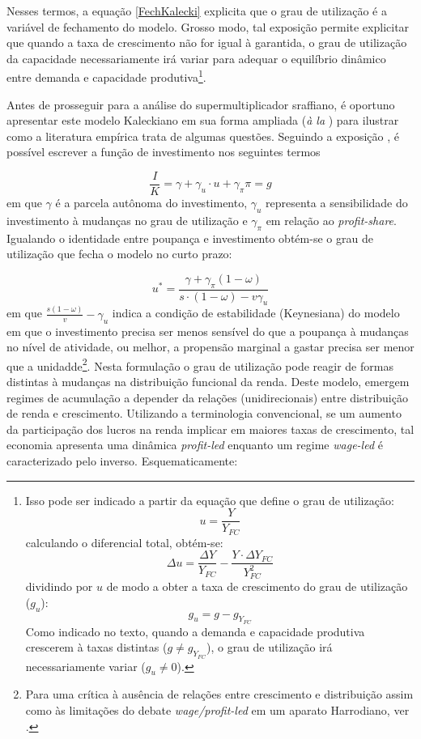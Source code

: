 Nesses termos, a equação \ref{FechKalecki} explicita que o grau de utilização é a variável de fechamento do modelo. Grosso modo, tal exposição permite explicitar que quando a taxa de crescimento não for igual à garantida, o grau de utilização da capacidade necessariamente irá variar para adequar o equilíbrio dinâmico entre demanda e capacidade produtiva\footnote{Isso pode ser indicado a partir da equação que define o grau de utilização:
$$
u = \frac{Y}{Y_{FC}}
$$
calculando o diferencial total, obtém-se:
$$
\Delta u = \frac{\Delta Y}{ Y_{FC}} - \frac{Y\cdot \Delta Y_{FC}}{Y_{FC}^2}
$$
dividindo por $u$ de modo a obter a taxa de crescimento do grau de utilização ($g_u$):
$$
g_u = g - g_{Y_{FC}}
$$
Como indicado no texto, quando a demanda e capacidade produtiva crescerem à taxas distintas ($g \neq g_{Y_{FC}}$), o grau de utilização irá necessariamente variar ($g_u \neq 0$).
}.

Antes de prosseguir para a análise do supermultiplicador sraffiano, é oportuno apresentar este modelo Kaleckiano em sua forma ampliada (\textit{à la} \textcite{bhaduri_unemployment_1990}) para ilustrar como a literatura empírica trata de algumas questões. Seguindo a exposição \textcite[Cap, 6]{lavoie_post-keynesian_2015}, é possível escrever a função de investimento nos seguintes termos

\begin{equation}
\label{PostKalecki}
\frac{I}{K} = \gamma + \gamma_u\cdot u + \gamma_{\pi}\pi = g
\end{equation}
em que $\gamma$ é a parcela autônoma do investimento, $\gamma_u$ representa a sensibilidade do investimento à mudanças no grau de utilização e $\gamma_{\pi}$ em relação ao \textit{profit-share}. Igualando o identidade entre poupança e investimento obtém-se o grau de utilização que fecha o modelo no curto prazo:

\begin{equation}
\label{KaleckiSR}
    u^{*} = \frac{\gamma + \gamma_{\pi}(1-\omega)}{s\cdot (1-\omega) - v\gamma_u}
\end{equation}
em que $\frac{s(1-\omega)}{v} - \gamma_u$ indica a condição de estabilidade (Keynesiana) do modelo em que o investimento precisa ser menos sensível do que a poupança à mudanças no nível de atividade, ou melhor, a propensão marginal a gastar precisa ser menor que a unidadde\footnote{Para uma crítica à ausência de relações entre crescimento e distribuição assim como às limitações do debate \textit{wage/profit-led} em um aparato
Harrodiano, 
ver 
\textcite{skott_weaknesses_2017}.}.
Nesta formulação o grau de utilização pode reagir de formas distintas à mudanças na distribuição funcional da renda. Deste modelo, emergem regimes de acumulação a depender da relações (unidirecionais) entre distribuição de renda e crescimento. Utilizando a terminologia convencional, se um aumento da participação dos lucros na renda implicar em maiores taxas de crescimento, tal economia apresenta uma dinâmica \textit{profit-led} enquanto um regime \textit{wage-led} é caracterizado pelo inverso. Esquematicamente:

